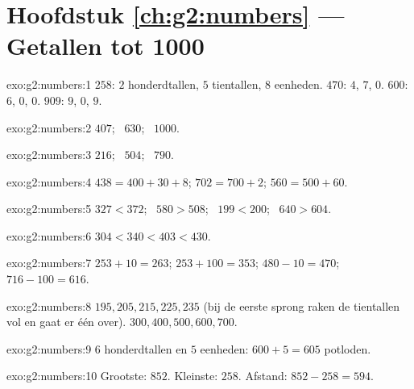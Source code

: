 \section*{Hoofdstuk \ref{ch:g2:numbers} --- Getallen tot 1000}

\begin{solution}{exo:g2:numbers:1}
$258$: $2$ honderdtallen, $5$ tientallen, $8$ eenheden. $470$: $4$,
$7$, $0$. $600$: $6$, $0$, $0$. $909$: $9$, $0$, $9$.
\end{solution}

\begin{solution}{exo:g2:numbers:2}
$407$; \ $630$; \ $1000$.
\end{solution}

\begin{solution}{exo:g2:numbers:3}
$216$; \ $504$; \ $790$.
\end{solution}

\begin{solution}{exo:g2:numbers:4}
$438 = 400 + 30 + 8$; \quad $702 = 700 + 2$; \quad
$560 = 500 + 60$.
\end{solution}

\begin{solution}{exo:g2:numbers:5}
$327 < 372$; \ $580 > 508$; \ $199 < 200$; \ $640 > 604$.
\end{solution}

\begin{solution}{exo:g2:numbers:6}
$304 < 340 < 403 < 430$.
\end{solution}

\begin{solution}{exo:g2:numbers:7}
$253 + 10 = 263$; \quad $253 + 100 = 353$; \quad
$480 - 10 = 470$; \quad $716 - 100 = 616$.
\end{solution}

\begin{solution}{exo:g2:numbers:8}
$195, 205, 215, 225, 235$ (bij de eerste sprong raken de tientallen vol
en gaat er één over). $300, 400, 500, 600, 700$.
\end{solution}

\begin{solution}{exo:g2:numbers:9}
$6$ honderdtallen en $5$ eenheden: $600 + 5 = 605$ potloden.
\end{solution}

\begin{solution}{exo:g2:numbers:10}
Grootste: $852$. Kleinste: $258$. Afstand: $852 - 258 = 594$.
\end{solution}
